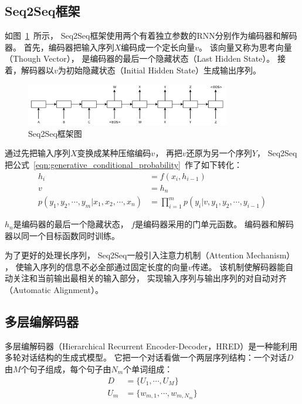 \subsection{Seq2Seq框架}\label{subsec:Seq2Seq}
如图~\ref{fig:Seq2Seq}~所示，
Seq2Seq框架使用两个有着独立参数的RNN分别作为编码器和解码器。
首先，编码器把输入序列$X$编码成一个定长向量$v$。
该向量又称为思考向量（Though Vector），
是编码器的最后一个隐藏状态（Last Hidden State）。
接着，解码器以$v$为初始隐藏状态（Initial Hidden State）生成输出序列。
\begin{figure}[H]
    \centering
    \includegraphics[width=0.8\textwidth]{figure/Seq2Seq.png}
    \caption{Seq2Seq框架图}
    \label{fig:Seq2Seq}
\end{figure}

通过先把输入序列$X$变换成某种压缩编码$v$，
再把$v$还原为另一个序列$Y$，
Seq2Seq把公式~\ref{eqn:generative_conditional_probability}~作了如下转化：
\begin{align}
    h_i &= f(x_i ,h_{i-1}) \\
    v &= h_n \\
    p(y_1, y_2, \cdots, y_m|x_1, x_2, \cdots, x_n) &=
    \prod_{i=1}^m p(y_i|v, y_1, y_2, \cdots, y_{i-1})
\end{align}

$h_n$是编码器的最后一个隐藏状态， $f$是编码器采用的门单元函数。
编码器和解码器以同一个目标函数同时训练。

为了更好的处理长序列，
Seq2Seq一般引入注意力机制（Attention Mechanism）
，
使输入序列的信息不必全部通过固定长度的向量$v$传递。
该机制使解码器能自动关注和当前输出最相关的输入部分，
实现输入序列与输出序列的对自动对齐（Automatic Alignment）。


\subsection{多层编解码器}\label{subsec:hierarchical_rnn}
多层编解码器（Hierarchical Recurrent Encoder-Decoder，HRED）是一种能利用多轮对话结构的生成式模型。
它把一个对话看做一个两层序列结构：一个对话$D$由$M$个句子组成，每个句子由$N_m$个单词组成：
\begin{align}
    D &= \{ U_1, \cdots, U_M \} \\
    U_m &= \{ w_{m, 1}, \cdots, w_{m, N_m} \}
\end{align}


